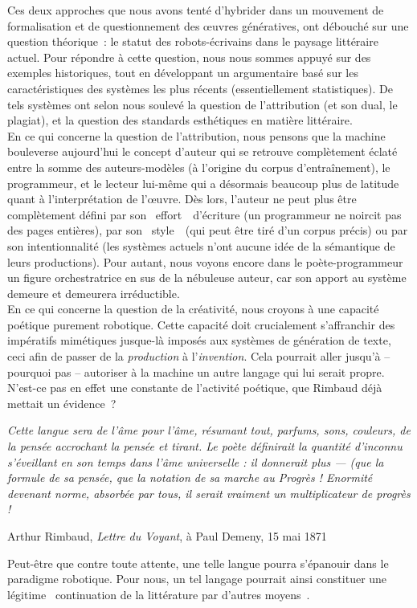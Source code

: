 \documentclass{article}
\newenvironment{citationbox}
{\begin{center}
		\begin{minipage}{.8\textwidth}
		}
		{
		\end{minipage}	
\end{center}
}
\begin{document}
		Ces deux approches que nous avons tenté d'hybrider dans un mouvement de formalisation et de questionnement des œuvres génératives, ont débouché sur une question théorique~: le statut des robots-écrivains dans le paysage littéraire actuel. Pour répondre à cette question, nous nous sommes appuyé sur des exemples historiques, tout en développant un argumentaire basé sur les caractéristiques des systèmes les plus récents (essentiellement statistiques). De tels systèmes ont selon nous soulevé la question de l'attribution (et son dual, le plagiat), et la question des standards esthétiques en matière littéraire.\\
		En ce qui concerne la question de l'attribution, nous pensons que la machine bouleverse aujourd'hui le concept d'auteur qui se retrouve complètement éclaté entre la somme des auteurs-modèles (à l'origine du corpus d'entraînement), le programmeur, et le lecteur lui-même qui a désormais beaucoup plus de latitude quant à l'interprétation de l'œuvre. Dès lors, l'auteur ne peut plus être complètement défini par son \guillemotleft~effort~\guillemotright~d'écriture (un programmeur ne noircit pas des pages entières), par son \guillemotleft~style~\guillemotright~(qui peut être tiré d'un corpus précis) ou par son intentionnalité (les systèmes actuels n'ont aucune idée de la sémantique de leurs productions). Pour autant, nous voyons encore dans le poète-programmeur un figure orchestratrice en sus de la nébuleuse auteur, car son apport au système demeure et demeurera irréductible.\\
		En ce qui concerne la question de la créativité, nous croyons à une capacité poétique purement robotique. Cette capacité doit crucialement s'affranchir des impératifs mimétiques jusque-là imposés aux systèmes de génération de texte, ceci afin de passer de la \textit{production} à l'\textit{invention}. Cela pourrait aller jusqu'à -- pourquoi pas -- autoriser à la machine un autre langage qui lui serait propre. N'est-ce pas en effet une constante de l'activité poétique, que Rimbaud déjà mettait un évidence~?
		\begin{citationbox}
			\textit{Cette langue sera de l’âme pour l’âme, résumant tout, parfums, sons, couleurs, de la pensée accrochant la pensée et tirant. Le poète définirait la quantité d’inconnu s’éveillant en son temps dans l’âme universelle : il donnerait plus — (que la formule de sa pensée, que la notation de sa marche au Progrès ! Enormité devenant norme, absorbée par tous, il serait vraiment un multiplicateur de progrès !}\begin{flushright}
				Arthur Rimbaud, \textit{Lettre du Voyant}, à Paul Demeny, 15 mai 1871
			\end{flushright}
		\end{citationbox}
		Peut-être que contre toute attente, une telle langue pourra s'épanouir dans le paradigme robotique. Pour nous, un tel langage pourrait ainsi constituer une légitime \guillemotleft~continuation de la littérature par d'autres moyens~\guillemotright.
		
\end{document}
